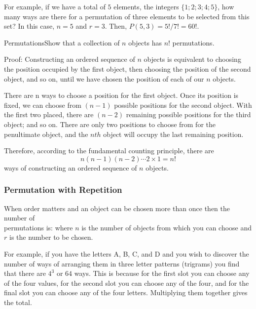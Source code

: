 For example, if we have a total of $5$ elements, the integers $\{1; 2; 3; 4; 5\}$, how many ways are there for a permutation of three elements to be selected from this set? In this case, $n = 5$ and $r = 3$. Then, $P(5,3) = 5!/7! = 60!$.

\begin{wex}{Permutations}{Show that a collection of $n$ objects has $n!$ permutations.}{Proof: Constructing an ordered sequence of $n$ objects is equivalent to choosing the position occupied by the first object, then choosing the position of the second object, and so on, until we have chosen the position of each of our $n$ objects.

There are n ways to choose a position for the first object. Once its position is fixed, we can choose from $(n-1)$ possible positions for the second object. With the first two placed, there are $(n-2)$ remaining possible positions for the third object; and so on. There are only two positions to choose from for the penultimate object, and the $nth$ object will occupy the last remaining position.

Therefore, according to the fundamental counting principle, there
are $$n(n-1)(n-2) \cdots 2 \times 1 = n!$$ ways of constructing an ordered sequence of $n$ objects.
}
\end{wex}

\subsubsection{Permutation with Repetition}

When order matters and an object can be chosen more than once then the number of \\permutations is:
where $n$ is the number of objects from which you can choose and $r$ is the number to be chosen.

For example, if you have the letters A, B, C, and D and you wish to discover the number of ways of arranging them in three letter patterns (trigrams) you find that there are $4^3$ or $64$ ways. This is because for the first slot you can choose any of the four values, for the second slot you can choose any of the four, and for the final slot you can choose any of the four letters. Multiplying them together gives the total.



